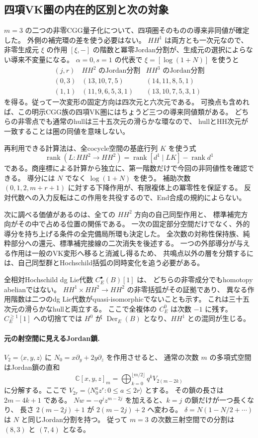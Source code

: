 \subsection{四項VK圏の内在的区別と次の対象}

$m=3$ の二つの非零CGG量子化について、四項圏そのものの導来非同値が確定した。
外側の補完環の差を使う必要はない。
$HH^1$ は両方とも一次元なので、非零生成元 $\xi$ の作用
$[\xi,-]$ の階数と冪零Jordan分割が、生成元の選択によらない導来不変量になる。
$\alpha=0,s=1$ の代表で $\xi=[\log(1+N)]$ を使うと
\[
\begin{array}{c|c|c}
(j,r)&HH^2\text{ のJordan分割}&HH^3\text{ のJordan分割}\\\hline
(0,3)&(13,10,7,5)&(14,11,8,5,1)\\
(1,1)&(11,9,6,5,3,1)&(13,10,7,5,3,1)
\end{array}
\]
を得る。従って一次変形の固定方向は四次元と六次元である。
可換点も含めれば、この明示CGG族の四項VK圏にはちょうど三つの導来同値類がある。
どちらの非零点でも通常のhullは三十五次元の滑らかな環なので、
hullとHH次元が一致することは圏の同値を意味しない。

再利用できる計算法は、全cocycle空間の基底行列 $K$ を使う式
\[
 \operatorname{rank}(L:HH^2\to HH^2)
 =\operatorname{rank}[d^1\mid LK]-\operatorname{rank}d^1
\]
である。商座標による計算から独立に、第一階数だけで今回の非同値性を確認できる。
導分には $N$ でなく $\log(1+N)$ を使う。
補助次数 $(0,1,2,m+r+1)$ に対する下降作用が、有限複体上の冪零性を保証する。
反対代数への入力反転はこの作用を共役するので、End合成の規約によらない。

次に調べる価値があるのは、全ての $HH^2$ 方向の自己同型作用と、
標準補完方向がその中で占める位置の関係である。
一次の固定部分空間だけでなく、外的導分を持ち上げる条件の全完備局所環も決定した。
全次数の対称性保持族、純粋部分への還元、標準補完接線の二次消失を後述する。
一つの外部導分が与える作用は一般のVK変形へ移ると消滅し得るため、
共鳴点以外の層を分類するには、自己同型群とHochschild括弧の同時変化を追う必要がある。


全相対Hochschild dg Lie代数 $C_E^\bullet(B)[1]$ は、
どちらの非零成分でもhomotopy abelianではない。
$HH^1\times HH^2\to HH^2$ の非零括弧がその証拠であり、
異なる作用階数は二つのdg Lie代数がquasi-isomorphicでないことも示す。
これは三十五次元の滑らかなhullと両立する。
ここで全複体の $C_E^0$ は次数 $-1$ に残す。
$C_E^{\ge1}[1]$ への切捨てでは $H^0$ が $\operatorname{Der}_E(B)$ となり、$HH^1$ との混同が生じる。

\paragraph{元の射空間に見えるJordan鎖.}
$V_2=\langle x,y,z\rangle$ に $N_0=x\partial_y+2y\partial_z$ を作用させると、
通常の次数 $m$ の多項式空間はJordan鎖の直和
\[
 \mathbb C[x,y,z]_m
   =\bigoplus_{k=0}^{\lfloor m/2\rfloor}q^k V_{2(m-2k)}
\]
に分解する。ここで $V_{2r}=\langle N_0^a z^r:0\le a\le2r\rangle$ とする。
その鎖の長さは $2m-4k+1$ である。
$Nw=-q^jz^{m-2j}$ を加えると、$k=j$ の鎖だけが一つ長くなり、
長さ $2(m-2j)+1$ が $2(m-2j)+2$ へ変わる。
$\delta=N(1-N/2+\cdots)$ は $N$ と同じJordan分割を持つ。
従って $m=3$ の次数三射空間での分割は $(8,3)$ と $(7,4)$ となる。

